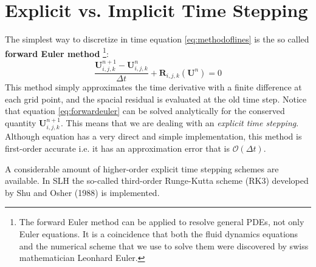 \section{Explicit vs. Implicit Time Stepping}
The simplest way to discretize in time equation \ref{eq:methodoflines} is the so called \textbf{forward Euler method} \footnote{The forward Euler method can be applied to resolve general PDEs, not only Euler equations. It is a coincidence that both the fluid dynamics equations and the numerical scheme that we use to solve them were discovered by swiss mathematician Leonhard Euler.}:
\begin{equation}\label{eq:forwardeuler}
	\frac{\mathbf{U}^{n+1}_{i, j, k} - \mathbf{U}^{n}_{i, j, k}}{\Delta t} + \mathbf{R}_{i, j, k}(\mathbf{U}^n)=0
\end{equation}
This method simply approximates the time derivative with a finite difference at each grid point, and the spacial residual is evaluated at the old time step. Notice that equation \ref{eq:forwardeuler} can be solved analytically for the conserved quantity $\mathbf{U}^{n+1}_{i, j, k}$. This means that we are dealing with an \textit{explicit time stepping}. Although equation \label{eq:forwardeuler} has a very direct and simple implementation, this method is first-order accurate i.e. it has an approximation error that is $\mathcal{O}(\Delta t)$.

A considerable amount of higher-order explicit time stepping schemes are available. In SLH the so-called third-order Runge-Kutta scheme (RK3) developed by Shu and Osher (1988) is implemented. 

